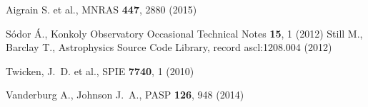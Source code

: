 \documentclass[epj,twocolumn]{webofc}
\begin{document}
% 
%
%

\begin{thebibliography}{}
%
%





Aigrain S. et al., MNRAS \textbf{447}, 2880 (2015)

S\'odor \'A., Konkoly Observatory Occasional Technical Notes \textbf{15}, 1 (2012)
Still M., Barclay T., Astrophysics Source Code Library, record
ascl:1208.004 (2012)

Twicken, J.~D. et al., SPIE \textbf{7740}, 1  (2010)


Vanderburg A., Johnson J.~A., PASP \textbf{126}, 948 (2014)

\end{thebibliography}

\end{document}
